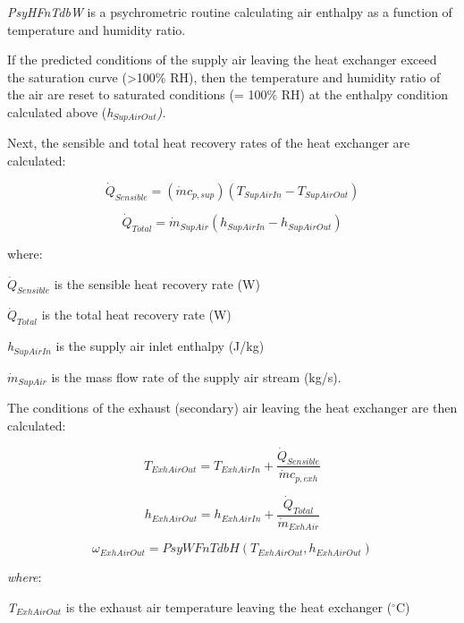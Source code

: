 \emph{PsyHFnTdbW} is a psychrometric routine calculating air enthalpy as a function of temperature and humidity ratio.

If the predicted conditions of the supply air leaving the heat exchanger exceed the saturation curve (\textgreater{}100\% RH), then the temperature and humidity ratio of the air are reset to saturated conditions (= 100\% RH) at the enthalpy condition calculated above (\emph{h\(_{SupAirOut}\)).}

Next, the sensible and total heat recovery rates of the heat exchanger are calculated:

\begin{equation}
{\dot{Q}_{Sensible}} = \left( {\dot{m} c_{p,sup}} \right)({T_{SupAirIn}} - {T_{SupAirOut}})
\label{eq:QSensibleHX600}
\end{equation}

\begin{equation}
{\dot{Q}_{Total}} = {\dot{m}_{SupAir}}({h_{SupAirIn}} - {h_{SupAirOut}})
\label{eq:QTotalHX601}
\end{equation}

where:

\({\dot{Q}_{Sensible}}\) is the sensible heat recovery rate (W)

\({\dot{Q}_{Total}}\) is the total heat recovery rate (W)

\emph{h\(_{SupAirIn}\)} is the supply air inlet enthalpy (J/kg)

\({\dot{m}_{SupAir}}\) is the mass flow rate of the supply air stream (kg/s).

The conditions of the exhaust (secondary) air leaving the heat exchanger are then calculated:

\begin{equation}
{T_{ExhAirOut}} = {T_{ExhAirIn}} + \frac{\dot{Q}_{Sensible}}{\dot{m} c_{p,exh}}
\end{equation}

\begin{equation}
{h_{ExhAirOut}} = {h_{ExhAirIn}} + \frac{\dot{Q}_{Total}}{\dot{m}_{ExhAir}}
\end{equation}

\begin{equation}
{\omega_{ExhAirOut}} = PsyWFnTdbH({T_{ExhAirOut}},{h_{ExhAirOut}})
\end{equation}

\emph{where}:

\emph{T\(_{ExhAirOut}\)} is the exhaust air temperature leaving the heat exchanger (\(^{\circ}\)C)

